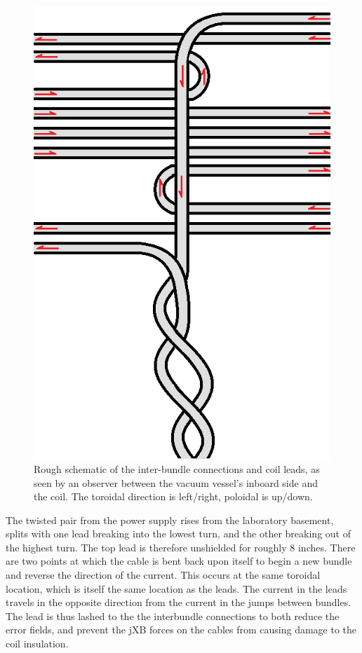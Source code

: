 \begin{figure}
\includegraphics[width = \textwidth]{./figures/Coil_winding_schematic.png}\begin{flushleft}
\caption{Rough schematic of the inter-bundle connections and coil leads, as seen by an observer between the vacuum vessel's inboard side and the coil.  The toroidal direction is left/right, poloidal is up/down.}
\end{flushleft}
\label{raw_sig}
\end{figure}
The twisted pair from the power supply rises from the laboratory basement, splits with one lead breaking into the lowest turn, and the other breaking out of the highest turn.  The top lead is therefore unshielded for roughly 8 inches.  There are two points at which the cable is bent back upon itself to begin a new bundle and reverse the direction of the current.  This occurs at the same toroidal location, which is itself the same location as the leads.  The current in the leads travels in the opposite direction from the current in the jumps between bundles.  The lead is thus lashed to the the interbundle connections to both reduce the error fields, and prevent the jXB forces on the cables from causing damage to the coil insulation.
